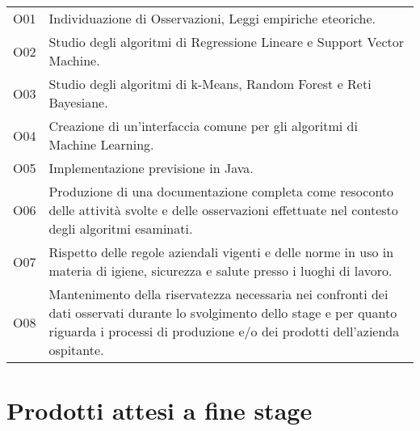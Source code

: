 {\renewcommand{\arraystretch}{2}
\begin{longtable}{|p{1cm}| p{12.25cm} |}
	\hline
	\rowcolor{blue} \multicolumn{2}{|c|}{
	\textbf{Requisiti Obbligatori}
	} \\
		\endhead
		\hline \rowcolor{lightbrown}
		O01 & 
		Individuazione di Osservazioni, Leggi empiriche  eteoriche. \\	
		\hline \rowcolor{lighterbrown}
		O02 & 
		Studio degli algoritmi di Regressione Lineare e Support Vector Machine. \\	
		\hline \rowcolor{lightbrown}
		O03 & 
		Studio degli algoritmi di k-Means, Random Forest e Reti Bayesiane.\\	
	\hline \rowcolor{lighterbrown}
		O04 & 
		Creazione di un'interfaccia comune per gli algoritmi di Machine Learning.\\	
	\hline \rowcolor{lightbrown}
		O05 & 
		Implementazione previsione in Java.\\	
	\hline \rowcolor{lighterbrown}
		O06 & 
		Produzione di una documentazione completa come resoconto delle attività svolte e delle
osservazioni effettuate nel contesto degli algoritmi esaminati.\\	
	\hline \rowcolor{lightbrown}
		O07 & 
		Rispetto delle regole aziendali vigenti e delle norme in uso in materia di igiene, sicurezza
e salute presso i luoghi di lavoro.\\	
	\hline \rowcolor{lighterbrown}
		O08 & 
		Mantenimento della riservatezza necessaria nei confronti dei dati osservati durante lo svolgimento dello stage e per quanto riguarda i processi di produzione e/o dei prodotti dell'azienda
ospitante.\\	
	\hline
\end{longtable}}

\pagebreak

\section{Prodotti attesi a fine stage}